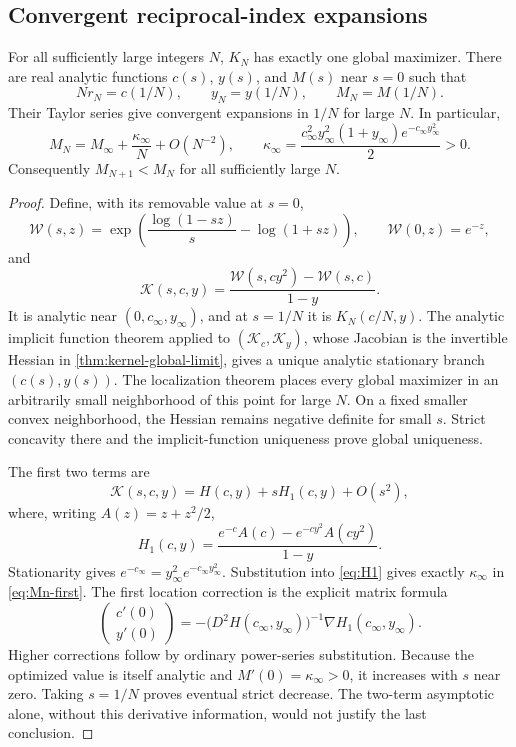\subsection{Convergent reciprocal-index expansions}

\begin{theorem}
\label{thm:kernel-expansion}
For all sufficiently large integers $N$, $K_N$ has exactly one
global maximizer. There are real analytic functions $c(s)$, $y(s)$,
and $M(s)$ near $s=0$ such that
\[
 Nr_N=c(1/N),\qquad y_N=y(1/N),\qquad M_N=M(1/N).
\]
Their Taylor series give convergent expansions in $1/N$ for large $N$.
In particular,
\begin{equation}\label{eq:Mn-first}
 M_N=M_\infty+\frac{\kappa_\infty}{N}+O(N^{-2}),\qquad
 \kappa_\infty=
 \frac{c_\infty^2y_\infty^2(1+y_\infty)
       e^{-c_\infty y_\infty^2}}2>0.
\end{equation}
Consequently $M_{N+1}<M_N$ for all sufficiently large $N$.
\end{theorem}
\begin{proof}
Define, with its removable value at $s=0$,
\[
 \mathcal W(s,z)=\exp\left(\frac{\log(1-sz)}s-\log(1+sz)\right),
 \qquad \mathcal W(0,z)=e^{-z},
\]
and
\[
 \mathcal K(s,c,y)=
 \frac{\mathcal W(s,cy^2)-\mathcal W(s,c)}{1-y}.
\]
It is analytic near $(0,c_\infty,y_\infty)$, and at $s=1/N$
it is $K_N(c/N,y)$. The analytic implicit function theorem applied
to $(\mathcal K_c,\mathcal K_y)$, whose Jacobian is the invertible
Hessian in \cref{thm:kernel-global-limit}, gives a unique analytic
stationary branch $(c(s),y(s))$. The localization theorem places
every global maximizer in an arbitrarily small neighborhood of this
point for large $N$. On a fixed smaller convex neighborhood, the Hessian
remains negative definite for small $s$. Strict concavity there and
the implicit-function uniqueness prove global uniqueness.

The first two terms are
\[
 \mathcal K(s,c,y)=H(c,y)+sH_1(c,y)+O(s^2),
\]
where, writing $A(z)=z+z^2/2$,
\begin{equation}\label{eq:H1}
 H_1(c,y)=\frac{e^{-c}A(c)-e^{-cy^2}A(cy^2)}{1-y}.
\end{equation}
Stationarity gives $e^{-c_\infty}=y_\infty^2e^{-c_\infty y_\infty^2}$.
Substitution into \eqref{eq:H1} gives exactly $\kappa_\infty$ in
\eqref{eq:Mn-first}. The first location correction is the explicit
matrix formula
\begin{equation}\label{eq:kernel-drift}
 \begin{pmatrix}c'(0)\\y'(0)\end{pmatrix}
 =-\bigl(D^2H(c_\infty,y_\infty)\bigr)^{-1}
        \nabla H_1(c_\infty,y_\infty).
\end{equation}
Higher corrections follow by ordinary power-series substitution.
Because the optimized value is itself analytic and
$M'(0)=\kappa_\infty>0$, it increases with $s$ near zero.
Taking $s=1/N$ proves eventual strict decrease. The two-term
asymptotic alone, without this derivative information, would not
justify the last conclusion.
\end{proof}

